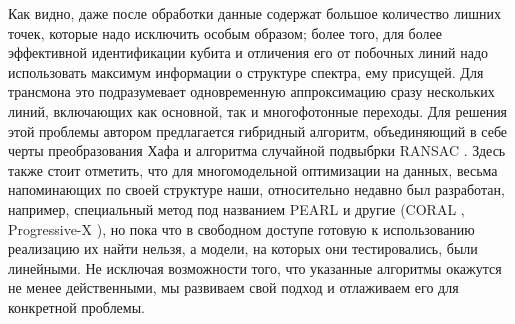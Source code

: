 \documentclass[14pt, a4paper]{extreport}
\numberwithin{equation}{section}
\begin{document}
	Как видно, даже после обработки данные содержат большое количество лишних точек, которые надо исключить особым образом; более того, для более эффективной идентификации кубита и отличения его от побочных линий надо использовать максимум информации о структуре спектра, ему присущей. Для трансмона это подразумевает одновременную аппроксимацию сразу нескольких линий, включающих как основной, так и многофотонные переходы. Для решения этой проблемы автором предлагается гибридный алгоритм, объединяющий в себе черты преобразования Хафа \cite{hough1962} и алгоритма случайной подвыбрки RANSAC \cite{fischler1981}. Здесь также стоит отметить, что для многомодельной оптимизации на данных, весьма напоминающих по своей структуре наши, относительно недавно был разработан, например, специальный метод под названием PEARL \cite{isack2012energy} и другие (CORAL \cite{amayo2018geometric}, Progressive-X \cite{barath2019progressive}), но пока что в свободном доступе готовую к использованию реализацию их найти нельзя, а модели, на которых они тестировались, были линейными. Не исключая возможности того, что указанные алгоритмы окажутся не менее действенными, мы развиваем свой подход и отлаживаем его для конкретной проблемы.
	
\end{document}
